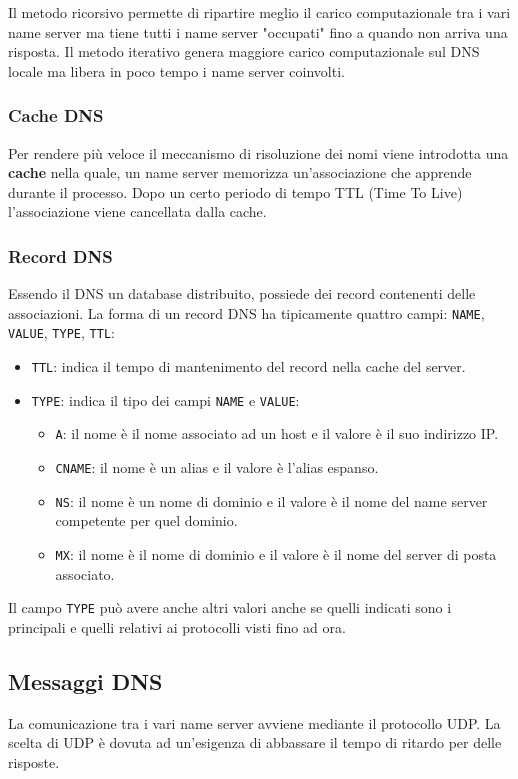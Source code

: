 Il metodo ricorsivo permette di ripartire meglio il carico computazionale tra i vari name server
ma tiene tutti i name server "occupati" fino a quando non arriva una risposta. Il metodo iterativo
genera maggiore carico computazionale sul DNS locale ma libera in poco tempo i name server
coinvolti.

\subsubsection{Cache DNS}
Per rendere più veloce il meccanismo di risoluzione dei nomi viene introdotta una \textbf{cache}
nella quale, un name server memorizza un'associazione che apprende durante il processo. Dopo un
certo periodo di tempo TTL (Time To Live) l'associazione viene cancellata dalla cache.

\subsubsection{Record DNS}
Essendo il DNS un database distribuito, possiede dei record contenenti delle associazioni.
La forma di un record DNS ha tipicamente quattro campi: \verb|NAME|, \verb|VALUE|, \verb|TYPE|,
\verb|TTL|:
\begin{itemize}
	\item \verb|TTL|: indica il tempo di mantenimento del record nella cache del server.
	\item \verb|TYPE|: indica il tipo dei campi \verb|NAME| e \verb|VALUE|:
		\begin{itemize}
			\item \verb|A|: il nome è il nome associato ad un host e il valore è
				il suo indirizzo IP.
			\item \verb|CNAME|: il nome è un alias e il valore è l'alias espanso.
			\item \verb|NS|: il nome è un nome di dominio e il valore è il nome del name server
				competente per quel dominio.
			\item \verb|MX|: il nome è il nome di dominio e il valore è il nome del server di
				posta associato.
		\end{itemize}
\end{itemize}
Il campo \verb|TYPE| può avere anche altri valori anche se quelli indicati sono i principali e
quelli relativi ai protocolli visti fino ad ora.

\subsection{Messaggi DNS}
La comunicazione tra i vari name server avviene mediante il protocollo UDP.  La scelta di UDP è
dovuta ad un'esigenza di abbassare il tempo di ritardo per delle risposte.

